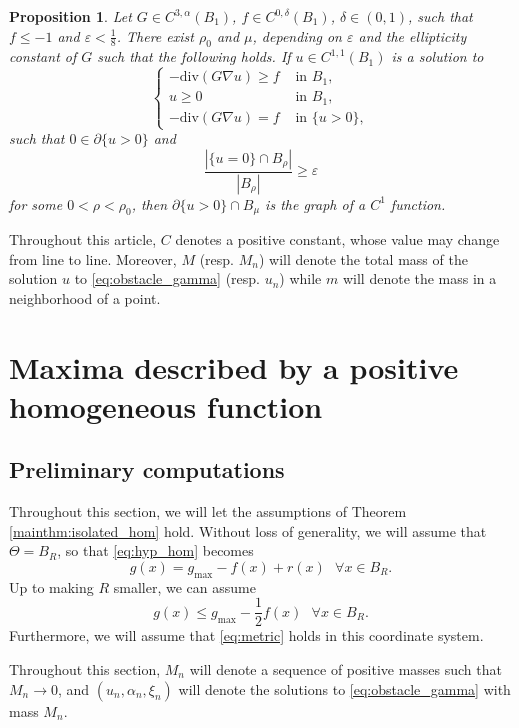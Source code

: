 \documentclass[10pt,a4paper]{article}
\newcommand{\gmax}{g_{\mathrm{max}}}
\newcommand{\divg}{\mathrm{div}}
\newcommand{\faskip}{\hspace{8pt}}
\newtheorem{prop}[thm]{Proposition}
\numberwithin{equation}{section}
\begin{document}
\begin{prop}
	\label{prop:reg}
	Let $ G \in C^{3, \alpha}(B_1) $, $ f \in C^{0,\delta}(B_1) $, $\delta\in (0,1)$, such that $ f\leq -1 $ and $ \varepsilon < \frac{1}{8}$. There exist $ \rho_0 $ and $ \mu $, depending on $ \varepsilon $ and the ellipticity constant of $ G $ such that the following holds. If $ u \in C^{1,1}(B_1) $ is a solution to
	\[
		\begin{cases}
			-\divg(G\nabla u) \geq f & \text{ in } B_1, \\ 
			u\geq 0 		& \text{ in } B_1, \\
			-\divg(G\nabla u) = f	& \text{ in }\{u > 0\},
		\end{cases}	
	\]
	such that $ 0 \in \partial \{u > 0 \}$ and 
	\[\frac{|\{u = 0\} \cap B_{\rho}|}{|B_{\rho}|} \geq \varepsilon	\]
	for some $ 0 < \rho < \rho_0 $, then $ \partial \{u > 0\} \cap B_{\mu}$ is the graph of a $ C^1 $ function. 
\end{prop}

Throughout this article, $ C $ denotes a positive constant, whose value may change from line to line. Moreover, $ M $ (resp. $ M_n $) will denote the total mass of the solution $ u $ to \eqref{eq:obstacle_gamma} (resp. $ u_n $) while $ m $ will denote the mass in a neighborhood of a point. 

\section{Maxima described by a positive homogeneous function}
\label{sect:hom}

\subsection{Preliminary computations}

Throughout this section, we will let the assumptions of Theorem \ref{mainthm:isolated_hom} hold. Without loss of generality, we will assume that $ \Theta = B_R $, so that \eqref{eq:hyp_hom} becomes
\[g(x) = \gmax - f(x) + r(x) \faskip \forall x\in B_R.\]
Up to making $ R $ smaller, we can assume
\begin{equation}
\label{eq:hypothesis_nondeg}
	g(x) \leq \gmax - \frac{1}{2} f(x) \faskip \forall x\in B_R.
\end{equation}
Furthermore, we will assume that \eqref{eq:metric} holds in this coordinate system.

Throughout this section, $M_n$ will denote a sequence of positive masses such that $ M_n\rightarrow 0 $, and $(u_n, \alpha_n, \xi_n)$ will denote the solutions to \eqref{eq:obstacle_gamma} with mass $M_n$. 
\end{document}
